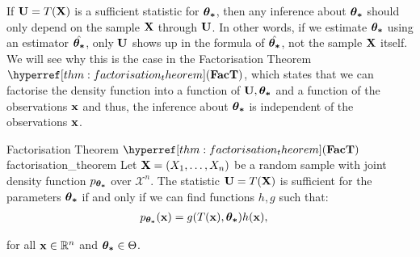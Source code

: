 \begin{definition}
    If ${\bf U}=T({\bf X})$ is a sufficient statistic for $\boldsymbol{\theta_*}$, then any inference about $\boldsymbol{\theta_*}$ should only depend on the sample ${\bf X}$ through ${\bf U}$. \color{blue}In other words, if we estimate $\boldsymbol{\theta_*}$ using an estimator $\hat{\boldsymbol{\theta_*}}$, only ${\bf U}$ shows up in the formula of $\hat{\boldsymbol{\theta_*}}$, not the sample ${\bf X}$ itself. We will see why this is the case in the Factorisation Theorem $\FacT$, which states that we can factorise the density function into a function of ${\bf U}, \boldsymbol{\theta_*}$ and a function of the observations ${\bf x}$ and thus, the inference about $\boldsymbol{\theta_*}$ is independent of the observations ${\bf x}$\color{black}.
\end{definition}

\begin{theorem}{Factorisation Theorem $\FacT$}{factorisation_theorem}
    Let ${\bf X} = (X_1, \dots, X_n)$ be a random sample with joint density function $p_{\boldsymbol{\theta_*}}$ over $\mathcal{X}^n$. The statistic ${\bf U}=T({\bf X})$ is sufficient for the parameters $\boldsymbol{\theta_*}$ if and only if we can find functions $h, g$ such that:
    \begin{align*}
        p_{\boldsymbol{\theta_*}}({\bf x}) &= g(T({\bf x}), \boldsymbol{\theta_*})h({\bf x}),
    \end{align*}

    \noindent for all ${\bf x}\in\mathbb{R}^n$ and $\boldsymbol{\theta_*}\in\Theta$.
\end{theorem}

